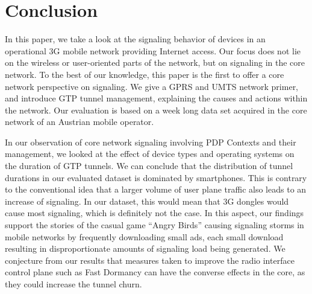 









\section{Conclusion}
\label{sec:conclusion-CONEXT}
\acresetall
In this paper, we take a look at the signaling behavior of devices in an operational \ac{3G} mobile network providing Internet access. Our focus does not lie on the wireless or user-oriented parts of the network, but on signaling in the core network. To the best of our knowledge, this paper is the first to offer a core network perspective on signaling. We give a \ac{GPRS} and \ac{UMTS} network primer, and introduce \ac{GTP} tunnel management, explaining the causes and actions within the network. Our evaluation is based on a week long data set acquired in the core network of an Austrian mobile operator.

In our observation of core network signaling involving PDP Contexts and their management, we looked at the effect of device types and operating systems on the duration of GTP tunnels. We can conclude that the distribution of tunnel durations in our evaluated dataset is dominated by smartphones. This is contrary to the conventional idea that a larger volume of user plane traffic also leads to an increase of signaling. In our dataset, this would mean that 3G dongles would cause most signaling, which is definitely not the case. In this aspect, our findings support the stories of the casual game ``Angry Birds'' causing signaling storms in mobile networks by frequently downloading small ads, each small download resulting in disproportionate amounts of signaling load being generated. We conjecture from our results that measures taken to improve the radio interface control plane such as Fast Dormancy can have the converse effects in the core, as they could increase the tunnel churn.

